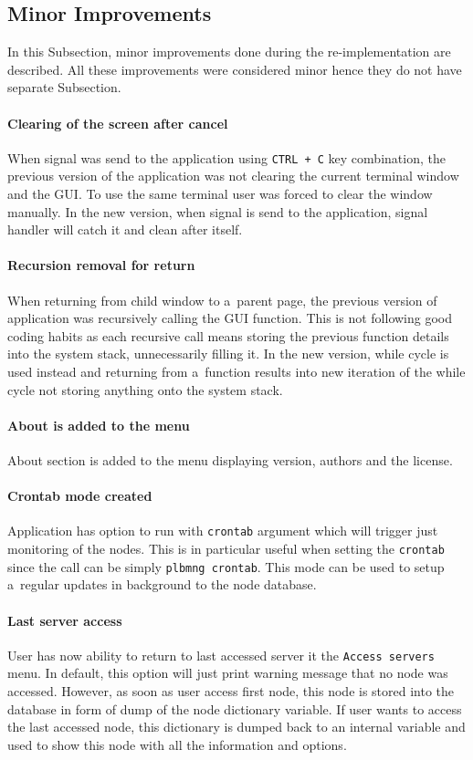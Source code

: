 {{{{{{\subsection{Minor Improvements}
In this Subsection, minor improvements done during the re-implementation are described. All these improvements were considered minor hence they do not have separate Subsection.
\paragraph{Clearing of the screen after cancel}
When signal was send to the application using \texttt{CTRL + C} key combination, the previous version of the application was not clearing the current terminal window and the GUI. To use the same terminal user was forced to clear the window manually. In the new version, when signal is send to the application, signal handler will catch it and clean after itself.
\paragraph{Recursion removal for return}
When returning from child window to a~parent page, the previous version of application was recursively calling the GUI function. This is not following good coding habits as each recursive call means storing the previous function details into the system stack, unnecessarily filling it. In the new version, while cycle is used instead and returning from a~function results into new iteration of the while cycle not storing anything onto the system stack. 
\paragraph{About is added to the menu}
About section is added to the menu displaying version, authors and the license.
\paragraph{Crontab mode created}
Application has option to run with \texttt{crontab} argument which will trigger just monitoring of the nodes. This is in particular useful when setting the \texttt{crontab} since the call can be simply \texttt{plbmng crontab}. This mode can be used to setup a~regular updates in background to the node database.
\paragraph{Last server access}
User has now ability to return to last accessed server it the \texttt{Access servers} menu. In default, this option will just print warning message that no node was accessed. However, as soon as user access first node, this node is stored into the database in form of dump of the node dictionary variable. If user wants to access the last accessed node, this dictionary is dumped back to an internal variable and used to show this node with all the information and options.
}}}}}}
